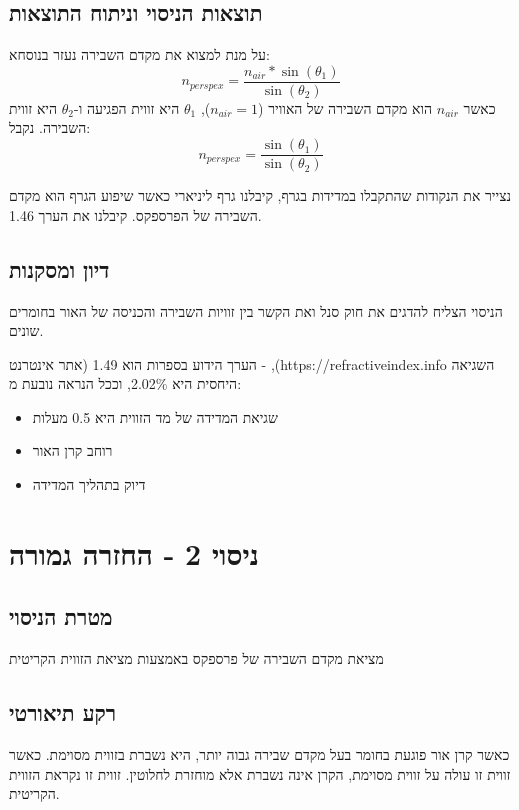 \documentclass[14pt]{extarticle}
\begin{document}
\subsection*{תוצאות הניסוי וניתוח התוצאות}
על מנת למצוא את מקדם השבירה נעזר בנוסחא:
\begin{equation}
n_{perspex} = \frac{n_{air} * \sin(\theta_1)}{\sin(\theta_2)}
\end{equation}
כאשר $n_{air}$ הוא מקדם השבירה של האוויר ($n_{air}=1$), $\theta_1$ היא זווית הפגיעה ו-$\theta_2$ היא זווית השבירה. נקבל:
\begin{equation}
n_{perspex} = \frac{\sin(\theta_1)}{\sin(\theta_2)}
\end{equation}

נצייר את הנקודות שהתקבלו במדידות בגרף, קיבלנו גרף ליניארי כאשר שיפוע הגרף הוא מקדם השבירה של הפרספקס. קיבלנו את הערך 1.46.

\subsection*{דיון ומסקנות}
הניסוי הצליח להדגים את חוק סנל ואת הקשר בין זוויות השבירה והכניסה של האור בחומרים שונים.

הערך הידוע בספרות הוא  1.49 (אתר אינטרנט - ,(https://refractiveindex.info השגיאה היחסית היא 2.02\%, וככל הנראה נובעת מ:
\begin{itemize}
    \item שגיאת המדידה של מד הזווית היא 0.5 מעלות
    \item רוחב קרן האור
    \item דיוק בתהליך המדידה
\end{itemize}

\section*{ניסוי 2 - החזרה גמורה}
\subsection*{מטרת הניסוי}
מציאת מקדם השבירה של פרספקס באמצעות מציאת הזווית הקריטית

\subsection*{רקע תיאורטי}
כאשר קרן אור פוגעת בחומר בעל מקדם שבירה גבוה יותר, היא נשברת בזווית מסוימת. כאשר זווית זו עולה על זווית מסוימת, הקרן אינה נשברת אלא מוחזרת לחלוטין. זווית זו נקראת הזווית הקריטית.
\end{document}
